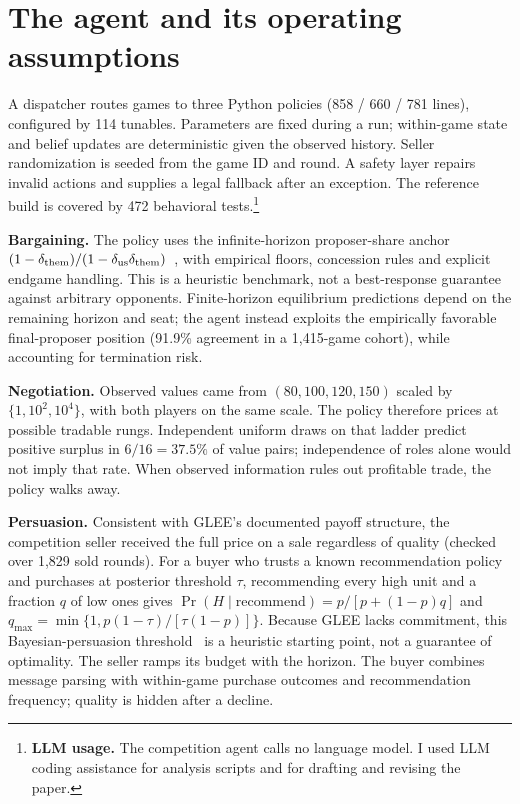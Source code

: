 \section{The agent and its operating assumptions}
A dispatcher routes games to three Python policies (858 / 660 / 781 lines),
configured by 114 tunables. Parameters are fixed during a run; within-game state
and belief updates are deterministic given the observed history. Seller
randomization is seeded from the game ID and round. A safety layer repairs
invalid actions and supplies a legal fallback after an exception. The reference
build is covered by 472 behavioral tests.\footnote{\textbf{LLM usage.} The competition
agent calls no language model. I used LLM coding assistance for analysis scripts
and for drafting and revising the paper.}

\textbf{Bargaining.} The policy uses the infinite-horizon proposer-share anchor
$(1-\delta_{\rm them})/(1-\delta_{\rm us}\delta_{\rm them})$~\cite{rubinstein1982},
with empirical floors, concession rules and explicit endgame handling. This is a
heuristic benchmark, not a best-response guarantee against arbitrary opponents.
Finite-horizon equilibrium predictions depend on the remaining horizon and seat;
the agent instead exploits the empirically favorable final-proposer position
(91.9\% agreement in a 1,415-game cohort), while accounting for termination risk.

\textbf{Negotiation.} Observed values came from $(80,100,120,150)$ scaled by
$\{1,10^2,10^4\}$, with both players on the same scale. The policy therefore
prices at possible tradable rungs. Independent uniform draws on that ladder
predict positive surplus in $6/16=37.5\%$ of value pairs; independence of roles
alone would not imply that rate. When observed information rules out profitable
trade, the policy walks away.

\textbf{Persuasion.} Consistent with GLEE's documented payoff structure, the
competition seller received the full price on a sale regardless of quality
(checked over 1,829 sold rounds). For a buyer who trusts a known recommendation
policy and purchases at posterior threshold $\tau$, recommending every high unit
and a fraction $q$ of low ones gives
$\Pr(H\mid\mathrm{recommend})=p/[p+(1-p)q]$ and
$q_{\max}=\min\{1,p(1-\tau)/[\tau(1-p)]\}$.
Because GLEE lacks commitment, this Bayesian-persuasion threshold~\cite{kamenica2011bayesian}
is a heuristic starting point, not a guarantee of optimality. The seller ramps its
budget with the horizon. The buyer combines message parsing with within-game
purchase outcomes and recommendation frequency; quality is hidden after a decline.

